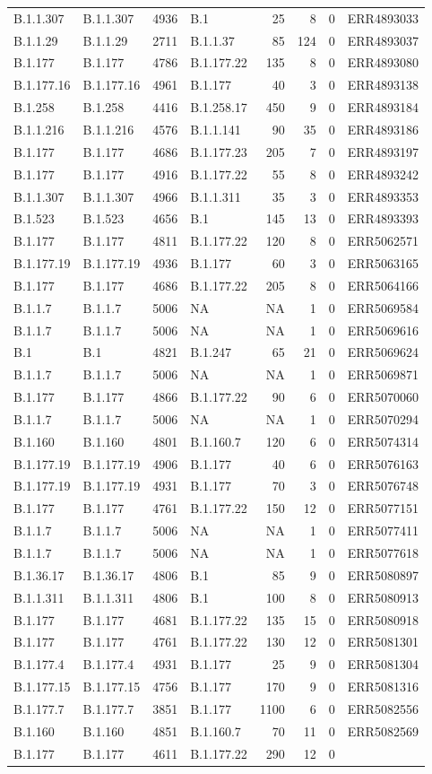 \documentclass[
]{article}
\begin{document}
\begin{longtable}[]{@{}llrlrrrl@{}}
B.1.1.307 & B.1.1.307 & 4936 & B.1 & 25 & 8 & 0 &
ERR4893033\tabularnewline
B.1.1.29 & B.1.1.29 & 2711 & B.1.1.37 & 85 & 124 & 0 &
ERR4893037\tabularnewline
B.1.177 & B.1.177 & 4786 & B.1.177.22 & 135 & 8 & 0 &
ERR4893080\tabularnewline
B.1.177.16 & B.1.177.16 & 4961 & B.1.177 & 40 & 3 & 0 &
ERR4893138\tabularnewline
B.1.258 & B.1.258 & 4416 & B.1.258.17 & 450 & 9 & 0 &
ERR4893184\tabularnewline
B.1.1.216 & B.1.1.216 & 4576 & B.1.1.141 & 90 & 35 & 0 &
ERR4893186\tabularnewline
B.1.177 & B.1.177 & 4686 & B.1.177.23 & 205 & 7 & 0 &
ERR4893197\tabularnewline
B.1.177 & B.1.177 & 4916 & B.1.177.22 & 55 & 8 & 0 &
ERR4893242\tabularnewline
B.1.1.307 & B.1.1.307 & 4966 & B.1.1.311 & 35 & 3 & 0 &
ERR4893353\tabularnewline
B.1.523 & B.1.523 & 4656 & B.1 & 145 & 13 & 0 &
ERR4893393\tabularnewline
B.1.177 & B.1.177 & 4811 & B.1.177.22 & 120 & 8 & 0 &
ERR5062571\tabularnewline
B.1.177.19 & B.1.177.19 & 4936 & B.1.177 & 60 & 3 & 0 &
ERR5063165\tabularnewline
B.1.177 & B.1.177 & 4686 & B.1.177.22 & 205 & 8 & 0 &
ERR5064166\tabularnewline
B.1.1.7 & B.1.1.7 & 5006 & NA & NA & 1 & 0 & ERR5069584\tabularnewline
B.1.1.7 & B.1.1.7 & 5006 & NA & NA & 1 & 0 & ERR5069616\tabularnewline
B.1 & B.1 & 4821 & B.1.247 & 65 & 21 & 0 & ERR5069624\tabularnewline
B.1.1.7 & B.1.1.7 & 5006 & NA & NA & 1 & 0 & ERR5069871\tabularnewline
B.1.177 & B.1.177 & 4866 & B.1.177.22 & 90 & 6 & 0 &
ERR5070060\tabularnewline
B.1.1.7 & B.1.1.7 & 5006 & NA & NA & 1 & 0 & ERR5070294\tabularnewline
B.1.160 & B.1.160 & 4801 & B.1.160.7 & 120 & 6 & 0 &
ERR5074314\tabularnewline
B.1.177.19 & B.1.177.19 & 4906 & B.1.177 & 40 & 6 & 0 &
ERR5076163\tabularnewline
B.1.177.19 & B.1.177.19 & 4931 & B.1.177 & 70 & 3 & 0 &
ERR5076748\tabularnewline
B.1.177 & B.1.177 & 4761 & B.1.177.22 & 150 & 12 & 0 &
ERR5077151\tabularnewline
B.1.1.7 & B.1.1.7 & 5006 & NA & NA & 1 & 0 & ERR5077411\tabularnewline
B.1.1.7 & B.1.1.7 & 5006 & NA & NA & 1 & 0 & ERR5077618\tabularnewline
B.1.36.17 & B.1.36.17 & 4806 & B.1 & 85 & 9 & 0 &
ERR5080897\tabularnewline
B.1.1.311 & B.1.1.311 & 4806 & B.1 & 100 & 8 & 0 &
ERR5080913\tabularnewline
B.1.177 & B.1.177 & 4681 & B.1.177.22 & 135 & 15 & 0 &
ERR5080918\tabularnewline
B.1.177 & B.1.177 & 4761 & B.1.177.22 & 130 & 12 & 0 &
ERR5081301\tabularnewline
B.1.177.4 & B.1.177.4 & 4931 & B.1.177 & 25 & 9 & 0 &
ERR5081304\tabularnewline
B.1.177.15 & B.1.177.15 & 4756 & B.1.177 & 170 & 9 & 0 &
ERR5081316\tabularnewline
B.1.177.7 & B.1.177.7 & 3851 & B.1.177 & 1100 & 6 & 0 &
ERR5082556\tabularnewline
B.1.160 & B.1.160 & 4851 & B.1.160.7 & 70 & 11 & 0 &
ERR5082569\tabularnewline
B.1.177 & B.1.177 & 4611 & B.1.177.22 & 290 & 12 & 0 &

\end{longtable}
\end{document}
